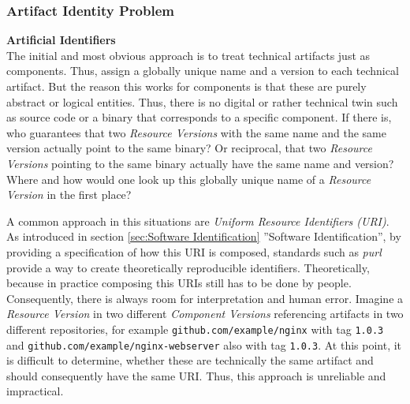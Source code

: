 \subsubsection{Artifact Identity Problem} 
\noindent\textbf{Artificial Identifiers}\\
The initial and most obvious approach is to treat technical artifacts just as components. Thus, assign a globally unique name and a version to each technical artifact. But the reason this works for components is that these are purely abstract or logical entities. Thus, there is no digital or rather technical twin such as source code or a binary that corresponds to a specific component. If there is, who guarantees that two \emph{Resource Versions} with the same name and the same version actually point to the same binary? Or reciprocal, that two \emph{Resource Versions} pointing to the same binary actually have the same name and version? Where and how would one look up this globally unique name of a \emph{Resource Version} in the first place?\par
A common approach in this situations are \emph{Uniform Resource Identifiers (URI)}. As introduced in section \ref{sec:Software Identification} ''Software Identification'', by providing a specification of how this URI is composed, standards such as \emph{purl} provide a way to create theoretically reproducible identifiers. Theoretically, because in practice composing this URIs still has to be done by people. Consequently, there is always room for interpretation and human error. Imagine a \emph{Resource Version} in two different \emph{Component Versions} referencing artifacts in two different repositories, for example \lstinline|github.com/example/nginx| with tag \lstinline|1.0.3| and \lstinline|github.com/example/nginx-webserver| also with tag \lstinline|1.0.3|. At this point, it is difficult to determine, whether these are technically the same artifact and should consequently have the same URI. Thus, this approach is unreliable and impractical.\\

